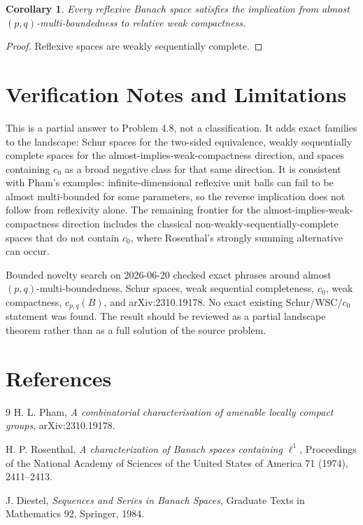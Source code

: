\documentclass[11pt]{article}
\newtheorem{corollary}{Corollary}
\begin{document}
\begin{corollary}
Every reflexive Banach space satisfies the implication from almost
\((p,q)\)-multi-boundedness to relative weak compactness.
\end{corollary}

\begin{proof}
Reflexive spaces are weakly sequentially complete.
\end{proof}

\section*{Verification Notes and Limitations}

This is a partial answer to Problem 4.8, not a classification.  It adds exact
families to the landscape: Schur spaces for the two-sided equivalence, weakly
sequentially complete spaces for the almost-implies-weak-compactness direction,
and spaces containing \(c_0\) as a broad negative class for that same
direction.  It is consistent with Pham's examples: infinite-dimensional
reflexive unit balls can fail to be almost multi-bounded for some parameters,
so the reverse implication does not follow from reflexivity alone.  The
remaining frontier for the almost-implies-weak-compactness direction includes
the classical non-weakly-sequentially-complete spaces that do not contain
\(c_0\), where Rosenthal's strongly summing alternative can occur.

Bounded novelty search on 2026-06-20 checked exact phrases around almost
\((p,q)\)-multi-boundedness, Schur spaces, weak sequential completeness,
\(c_0\), weak compactness, \(c_{p,q}(B)\), and arXiv:2310.19178.  No exact
existing Schur/WSC/\(c_0\) statement was found.  The result should be reviewed
as a partial landscape theorem rather than as a full solution of the source
problem.

\section*{References}

\begin{thebibliography}{9}
H. L. Pham,
\emph{A combinatorial characterisation of amenable locally compact groups},
arXiv:2310.19178.

H. P. Rosenthal,
\emph{A characterization of Banach spaces containing \(\ell^1\)},
Proceedings of the National Academy of Sciences of the United States of America
71 (1974), 2411--2413.

J. Diestel,
\emph{Sequences and Series in Banach Spaces},
Graduate Texts in Mathematics 92, Springer, 1984.
\end{thebibliography}
\end{document}
